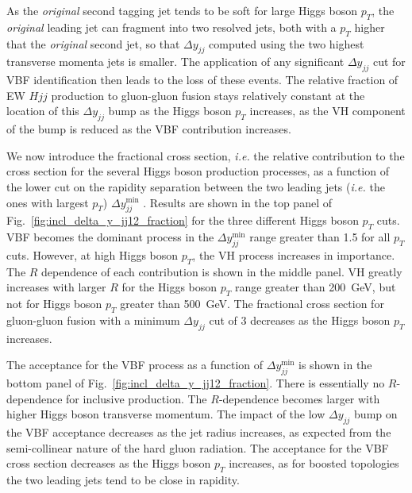 \documentclass[10pt,prd,fleqn,superscriptaddress,notitlepage,nofootinbib,preprintnumbers,nobalancelastpage]{revtex4-1}
\newcommand{\VBF}{VBF\xspace}
\newcommand{\VH}{VH\xspace}
\begin{document}
As the {\it original} second tagging jet tends to be soft for large Higgs boson $p_T$, the {\it original} leading jet can fragment into two resolved jets, both with a $p_T$ higher that the {\it original} second jet, so that $\Delta y_{jj}$ computed using the two highest transverse momenta jets is smaller. The application of any significant $\Delta y_{jj}$ cut for \VBF identification then leads to the loss of these events. The relative fraction of EW $Hjj$ production to gluon-gluon fusion stays relatively constant  at the location of this $\Delta y_{jj}$ bump as the Higgs boson $p_T$ increases, as the \VH component of the bump is reduced as the \VBF contribution increases.

We now introduce the fractional cross section, \emph{i.e.} the relative contribution to the cross section for the several Higgs boson production processes, as a function of the lower cut on the rapidity separation between the two leading jets (\emph{i.e.} the ones with largest $p_T$) $\Delta y^{\min}_{jj}$ . Results are shown in the top panel of Fig.~\ref{fig:incl_delta_y_jj12_fraction}  for the three different Higgs boson $p_T$ cuts. \VBF becomes the dominant process in the $\Delta y^{\min}_{jj}$ range greater than 1.5 for all $p_T$ cuts. However, at high Higgs boson $p_T$, the \VH process increases in importance. The $R$ dependence of each contribution is shown in the middle panel. \VH greatly increases with larger $R$ for the Higgs boson $p_T$ range greater than 200~GeV, but not for Higgs boson $p_T$ greater than 500~GeV.
The fractional cross section for gluon-gluon fusion with a minimum $\Delta y_{jj}$ cut of 3 decreases as the Higgs boson $p_T$ increases.

The acceptance for the \VBF process as a function of $\Delta y^{\min}_{jj}$ is shown in the bottom panel of Fig.~\ref{fig:incl_delta_y_jj12_fraction}. There is essentially no $R$-dependence for inclusive production. The $R$-dependence becomes larger with higher Higgs boson transverse momentum. The impact of the low $\Delta y_{jj}$ bump on the \VBF acceptance decreases as the jet radius increases, as expected from the semi-collinear nature of the hard gluon radiation.
The acceptance for the \VBF cross section decreases as the Higgs boson $p_T$ increases, as for boosted topologies the two leading jets tend to be close in rapidity.
\end{document}
